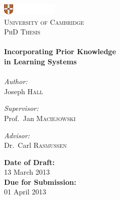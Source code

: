 \begin{titlepage}
\begin{center}
\includegraphics[width=0.2\textwidth]{figs/logo.pdf}\\[1cm]
\textsc{\LARGE University of Cambridge}\\[1.5cm]
\textsc{\Large PhD Thesis}\\[0.5cm]

\HRule \\[0.4cm]
{ \huge \bfseries Incorporating Prior Knowledge \\[0.2cm] in Learning Systems }\\[0.4cm]
\HRule \\[1.5cm]

\large{
\emph{Author:}\\
Joseph \textsc{Hall}
}
\\[0.5cm]

\begin{minipage}{0.45\textwidth}
\begin{flushleft} \large
\emph{Supervisor:}\\
Prof.~Jan \textsc{Maciejowski}
\end{flushleft}
\end{minipage}
\begin{minipage}{0.45\textwidth}
\begin{flushright} \large
\emph{Advisor:} \\
Dr.~Carl \textsc{Rasmussen}
\end{flushright}
\end{minipage}

\vfill
\textbf{\large Date of Draft:}\\[0.1cm]
{\large 13 March 2013}\\[0.5cm]
\textbf{\large Due for Submission:}\\[0.1cm]
{\large 01 April 2013}
\end{center}
\end{titlepage}
